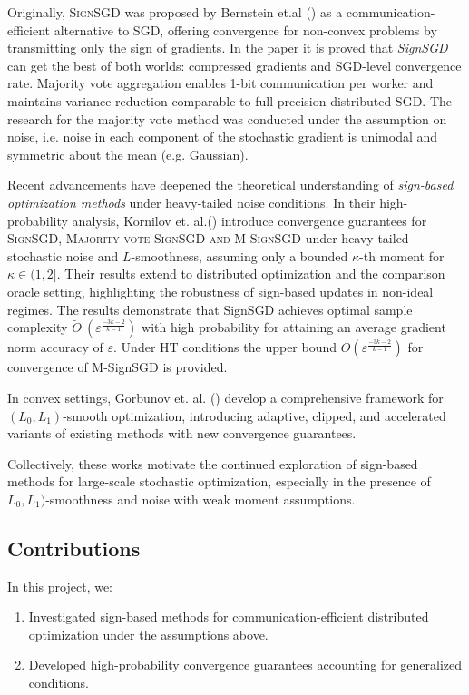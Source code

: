 \documentclass[12pt]{article}
\begin{document}
Originally, \textsc{SignSGD} was proposed by Bernstein et.al (\cite{pmlr-v80-bernstein18a}) as a communication-efficient alternative to SGD, offering convergence for non-convex problems by transmitting only the sign of gradients. In the paper it is proved that \textit{SignSGD} can get the best of both worlds: compressed gradients and SGD-level convergence rate. Majority vote aggregation enables 1-bit communication per worker and maintains variance reduction comparable to full-precision distributed SGD. The research for the majority vote method was conducted under the assumption on noise, i.e. noise in each component of the stochastic gradient is unimodal and symmetric about the mean (e.g. Gaussian).  

Recent advancements have deepened the theoretical understanding of \textit{sign-based optimization methods} under heavy-tailed noise conditions. In their high-probability analysis, Kornilov et. al.(\cite{Kornilov2025}) introduce convergence guarantees for \textsc{SignSGD, Majority vote SignSGD and M-SignSGD} under heavy-tailed stochastic noise and $L$-smoothness, assuming only a bounded $\kappa$-th moment for $\kappa \in (1,2]$. Their results extend to distributed optimization and the comparison oracle setting, highlighting the robustness of sign-based updates in non-ideal regimes. The results demonstrate that SignSGD achieves optimal sample complexity $\tilde{O}~\left(\varepsilon^\frac{−3k-2}{k−1}\right)$ with high probability for attaining an average gradient norm accuracy of $\varepsilon$. Under HT conditions the upper bound ${O}\left(\varepsilon^\frac{−3k-2}{k−1}\right)$ for convergence of M-SignSGD is provided.

In convex settings, Gorbunov et. al. (\cite{gorbunov}) develop a comprehensive framework for \((L_0, L_1)\)-smooth optimization, introducing adaptive, clipped, and accelerated variants of existing methods with new convergence guarantees. 

Collectively, these works motivate the continued exploration of sign-based methods for large-scale stochastic optimization, especially in the presence of  \(L_0, L_1)\)-smoothness and noise with weak moment assumptions.

\subsection{Contributions}
In this project, we:

\begin{enumerate}
    \item Investigated sign-based methods for communication-efficient distributed optimization under the assumptions above.
    \item Developed high-probability convergence guarantees accounting for generalized conditions.
\end{enumerate}
\end{document}
